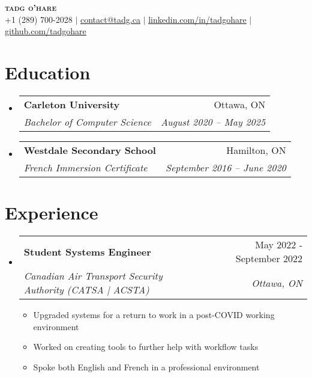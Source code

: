 \documentclass[letterpaper,11pt]{article}
\makeatletter
\newcommand{\resumeItem}[1]{
  \item\small{
    {#1 \vspace{-2pt}}
  }
}
\newcommand{\resumeSubheading}[4]{
  \vspace{-2pt}\item
    \begin{tabular*}{0.97\textwidth}[t]{l@{\extracolsep{\fill}}r}
      \textbf{#1} & #2 \\
      \textit{\small#3} & \textit{\small #4} \\
    \end{tabular*}\vspace{-7pt}
}
\newcommand{\resumeSubSubheading}[2]{
    \item
    \begin{tabular*}{0.97\textwidth}{l@{\extracolsep{\fill}}r}
      \textit{\small#1} & \textit{\small #2} \\
    \end{tabular*}\vspace{-7pt}
}
\newcommand{\resumeSubHeadingListStart}{\begin{itemize}[leftmargin=0.15in, label={}]}
\newcommand{\resumeSubHeadingListEnd}{\end{itemize}}
\newcommand{\resumeItemListStart}{\begin{itemize}}
\newcommand{\resumeItemListEnd}{\end{itemize}\vspace{-5pt}}
\makeatother
\begin{document}

\begin{center}
    \textbf{\Huge \scshape tadg o'hare} \\ \vspace{1pt}
    \small +1 (289) 700-2028 $|$ \href{mailto:contact@tadg.ca}{\underline{contact@tadg.ca}} $|$ 
    \href{https://linkedin.com/in/tadgohare}{\underline{linkedin.com/in/tadgohare}} $|$
    \href{https://github.com/tadgohare}{\underline{github.com/tadgohare}}
\end{center}


\section{Education}
  \resumeSubHeadingListStart
    \resumeSubheading
      {Carleton University}{Ottawa, ON}
      {Bachelor of Computer Science}{August 2020 -- May 2025}
    \resumeSubheading
      {Westdale Secondary School}{Hamilton, ON}
      {French Immersion Certificate}{September 2016 -- June 2020}
  \resumeSubHeadingListEnd

\section{Experience}
  \resumeSubHeadingListStart
    \resumeSubheading
      {Student Systems Engineer}{May 2022 - September 2022}
      {Canadian Air Transport Security Authority (CATSA | ACSTA)}{Ottawa, ON}
      \resumeItemListStart
        \resumeItem{Upgraded systems for a return to work in a post-COVID working environment}
        \resumeItem{Worked on creating tools to further help with workflow tasks}
        \resumeItem{Spoke both English and French in a professional environment}
      \resumeItemListEnd
    \resumeSubHeadingListEnd
\end{document}
